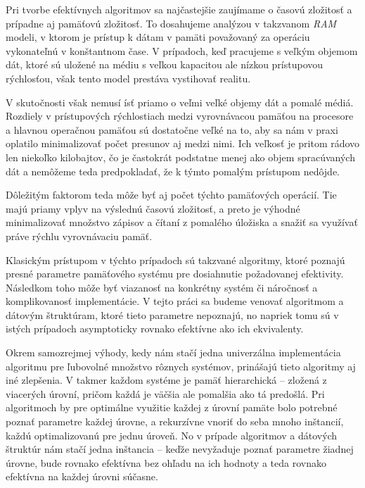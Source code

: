 
Pri tvorbe efektívnych algoritmov sa najčastejšie zaujímame o časovú zložitosť a prípadne aj pamäťovú zložitosť. To dosahujeme analýzou v takzvanom \emph{RAM} modeli, v ktorom je prístup k dátam v pamäti považovaný za operáciu vykonateľnú v konštantnom čase. V prípadoch, keď pracujeme s veľkým objemom dát, ktoré sú uložené na médiu s veľkou kapacitou ale nízkou prístupovou rýchlosťou, však tento model prestáva vystihovať realitu.

V skutočnosti však nemusí ísť priamo o veľmi veľké objemy dát a pomalé médiá. Rozdiely v prístupových rýchlostiach medzi vyrovnávacou pamäťou na procesore a hlavnou operačnou pamäťou sú dostatočne veľké na to, aby sa nám v praxi oplatilo minimalizovať počet presunov aj medzi nimi. Ich veľkosť je pritom rádovo len niekoľko kilobajtov, čo je častokrát podstatne menej ako objem spracúvaných dát a nemôžeme teda predpokladať, že k týmto pomalým prístupom nedôjde.

Dôležitým faktorom teda môže byť aj počet týchto pamäťových operácií. Tie majú priamy vplyv na výslednú časovú zložitosť, a preto je výhodné minimalizovať množstvo zápisov a čítaní z pomalého úložiska a snažiť sa využívať práve rýchlu vyrovnávaciu pamäť. 

Klasickým prístupom v týchto prípadoch sú takzvané \aware algoritmy, ktoré poznajú presné parametre pamäťového systému pre dosiahnutie požadovanej efektivity. Následkom toho môže byť viazanosť na konkrétny systém či náročnosť a komplikovanosť implementácie. V tejto práci sa budeme venovať \obliv algoritmom a dátovým štruktúram, ktoré tieto parametre nepoznajú, no napriek tomu sú v istých prípadoch asymptoticky rovnako efektívne ako ich \aware ekvivalenty.

Okrem samozrejmej výhody, kedy nám stačí jedna univerzálna implementácia algoritmu pre ľubovolné množstvo rôznych systémov, prinášajú tieto algoritmy aj iné zlepšenia. V takmer každom systéme je pamäť hierarchická -- zložená z viacerých úrovní, pričom každá je väčšia ale pomalšia ako tá predošlá. Pri \aware algoritmoch by pre optimálne využitie každej z úrovní pamäte bolo potrebné poznať parametre každej úrovne, a rekurzívne vnoriť do seba mnoho inštancií, každú optimalizovanú pre jednu úroveň. No v prípade \obliv algoritmov a dátových štruktúr nám stačí jedna inštancia -- keďže nevyžaduje poznať parametre žiadnej úrovne, bude rovnako efektívna bez ohľadu na ich hodnoty a teda rovnako efektívna na každej úrovni súčasne.

